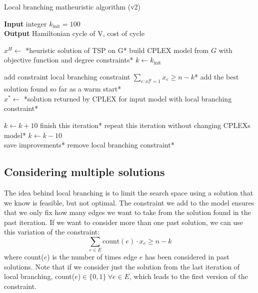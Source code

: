\begin{algorithm}[h]
    \caption{Local branching matheuristic algorithm (v2)}
    \textbf{Input} integer $k_{\text{init}} = 100$\\
    \textbf{Output} Hamiltonian cycle of V, cost of cycle\\
    \begin{algorithmic}

        \State $x^H \gets$ *heuristic solution of TSP on G*
        \State *build CPLEX model from $G$ with objective function and degree constraints*
        \State $k\gets k_{\text{init}}$\\


                \State *add constraint local branching constraint $\sum_{e:x_e^H=1}x_e\geq n-k$*
                \State *add the best solution found so far as a warm start*
            \EndIf\\

            \State $x^*\gets$ *solution returned by CPLEX for input model with local branching constraint*\\


                    \State $k\gets k+10$
                    \State *finish this iteration*
                \Else
                    \State *repeat this iteration without changing CPLEXs model*
                \EndIf
            \Else
                    \State $k\gets k-10$
                \EndIf
            \EndIf\\

            \State *save improvements*
            \State *remove local branching constraint*

        \EndWhile

    \end{algorithmic}
\end{algorithm}

\newpage

\subsection{Considering multiple solutions}

The idea behind local branching is to limit the search space using a solution that we know is feasible, but not optimal. The constraint we add to the model ensures that we only fix how many edges we want to take from the solution found in the past iteration. If we want to consider more than one past solution, we can use this variation of the constraint:
$$\sum_{e\in E}\mbox{count}(e)\cdot x_e\geq n-k$$
where count($e$) is the number of times edge $e$ has been considered in past solutions. Note that if we consider just the solution from the last iteration of local branching, count($e$)$\in\{0,1\} \ \forall e\in E$, which leads to the first version of the constraint.


